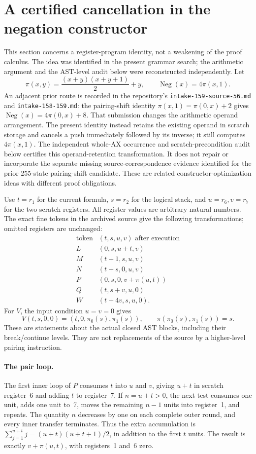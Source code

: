 \section{A certified cancellation in the negation constructor}
\label{sec:negation-peephole}

This section concerns a register-program identity, not a weakening of the
proof calculus.  The idea was identified in the present grammar search;
the arithmetic argument and the AST-level audit below were reconstructed
independently.  Let
\[
 \pi(x,y)=\frac{(x+y)(x+y+1)}2+y,
 \qquad \operatorname{Neg}(x)=4\pi(x,1).
\]
An adjacent prior route is recorded in the repository's
\texttt{intake-159-source-56.md} and \texttt{intake-158-159.md}:
the pairing-shift identity
$\pi(x,1)=\pi(0,x)+2$ gives
$\operatorname{Neg}(x)=4\pi(0,x)+8$.
That submission changes the arithmetic operand arrangement.  The present
identity instead retains the existing operand in scratch storage and
cancels a push immediately followed by its inverse; it still computes
$4\pi(x,1)$.  The independent whole-AX occurrence and scratch-precondition
audit below certifies this operand-retention transformation.  It does not
repair or incorporate the separate missing source-correspondence evidence
identified for the prior 255-state pairing-shift candidate.  These are
related constructor-optimization ideas with different proof obligations.

Use $t=r_1$ for the current formula, $s=r_2$ for the logical stack, and
$u=r_6,v=r_7$ for the two scratch registers.  All register values are arbitrary
natural numbers.  The exact fine tokens in the archived source give the
following transformations; omitted registers are unchanged:
\[
\begin{array}{c|c}
\text{token}&(t,s,u,v)\text{ after execution}\\\hline
L&(0,s,u+t,v)\\
M&(t+1,s,u,v)\\
N&(t+s,0,u,v)\\
P&(0,s,0,v+\pi(u,t))\\
Q&(t,s+v,u,0)\\
W&(t+4v,s,u,0).
\end{array}
\]
For $V$, the input condition $u=v=0$ gives
\[
 V(t,s,0,0)=(t,0,\pi_0(s),\pi_1(s)),
 \qquad \pi(\pi_0(s),\pi_1(s))=s.
\]
These are statements about the actual closed AST blocks, including their
break/continue levels.  They are not replacements of the source by a
higher-level pairing instruction.

\paragraph{The pair loop.}
The first inner loop of $P$ consumes $t$ into $u$ and $v$, giving
$u+t$ in scratch register~6 and adding $t$ to register~7.  If $n=u+t>0$,
the next test consumes one unit, adds one unit to~7, moves the remaining
$n-1$ units into register~1, and repeats.  The quantity $n$ decreases by
one on each complete outer round, and every inner transfer terminates.
Thus the extra accumulation is
$\sum_{j=1}^{u+t}j=(u+t)(u+t+1)/2$, in addition to the first $t$ units.
The result is exactly $v+\pi(u,t)$, with registers~1 and~6 zero.

